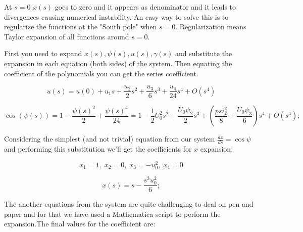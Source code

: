 \documentclass[12pt]{article}
\begin{document}
At $s=0$ $x(s)$ goes to zero and it appears as denominator and it leads to divergences causing numerical instability. An easy way to solve this is to regularize the functions at the "South pole" when $s=0$. Regularization means Taylor expansion of all functions around $s=0$.


First you need to expand $x(s),\psi(s),u(s),\gamma(s)$ and substitute the expansion in each equation (both sides) of the system. Then equating the coefficient of the polynomials you can get the series coefficient.

$$
u(s)=u(0) + u_1s + \frac{u_2 }{2}s^2 + \frac{u_3 }{6}s^3 + \frac{u_4 }{24}s^4 + O(s^4)
$$


$$
\cos(\psi(s))= 1 - \frac{\psi(s)^2}{2} + \frac{\psi(s)^4}{24} = 1 - \frac{1}{2} U_0^2 s^2 + \frac{U_0 \psi_2}{2} s^3 + (\frac{psi_2^2}{8} + \frac{U_0 \psi_3}{6}) s^4 +O(s^4);
$$













Considering the simplest (and not trivial) equation from our system $\frac{dx}{ds} =  \cos \psi$ and performing this substitution we'll get the coefficients for $x$ expansion:

$$
x_1 = 1 ,\; x_2 = 0 ,\; x_3 = - u_0^2 ,\; x_4 = 0
$$

$$
x(s)=s-\frac{s^3 u_0^2}{6};
$$

The another equations from the system are quite challenging to deal on pen and paper and for that we have used a Mathematica script to perform the expansion.The final values for the coefficient are:
\end{document}
